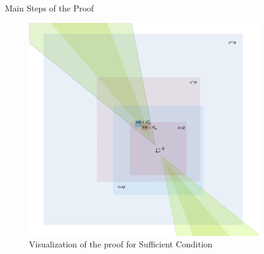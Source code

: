 \documentclass[final]{beamer}
\newlength{\colwidth}
\begin{document}
\begin{frame}[t]
\begin{columns}[t]
\begin{column}{\colwidth}
\begin{block}{Main Steps of the Proof}
    
    \begin{figure}
      \centering
      \includegraphics[width = 0.9\textwidth]{images/2sq.png}
      \caption{Visualization of the proof for Sufficient Condition}
    \end{figure}
        
    
    

\end{block}
\end{column}
\end{columns}
\end{frame}
\end{document}
